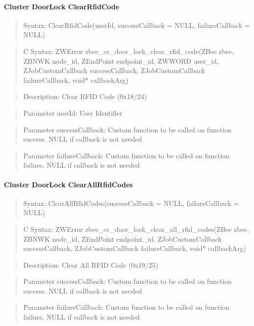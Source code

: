 \paragraph{Cluster DoorLock ClearRfidCode}
\begin{quote}Syntax: ClearRfidCode(userId, successCallback = NULL, failureCallback = NULL)\end{quote}
\begin{quote}C Syntax: ZWError zbee\_cc\_door\_lock\_clear\_rfid\_code(ZBee zbee, ZBNWK node\_id, ZEndPoint endpoint\_id, ZWWORD user\_id, ZJobCustomCallback successCallback, ZJobCustomCallback failureCallback, void* callbackArg)\end{quote}
\begin{quote}Description: Clear RFID Code (0x18/24)\end{quote}
\begin{quote}Parameter userId: User Identifier\end{quote}
\begin{quote}Parameter successCallback: Custom function to be called on function success. NULL if callback is not needed\end{quote}
\begin{quote}Parameter failureCallback: Custom function to be called on function failure. NULL if callback is not needed\end{quote}


\paragraph{Cluster DoorLock ClearAllRfidCodes}
\begin{quote}Syntax: ClearAllRfidCodes(successCallback = NULL, failureCallback = NULL)\end{quote}
\begin{quote}C Syntax: ZWError zbee\_cc\_door\_lock\_clear\_all\_rfid\_codes(ZBee zbee, ZBNWK node\_id, ZEndPoint endpoint\_id, ZJobCustomCallback successCallback, ZJobCustomCallback failureCallback, void* callbackArg)\end{quote}
\begin{quote}Description: Clear All RFID Code (0x19/25)\end{quote}
\begin{quote}Parameter successCallback: Custom function to be called on function success. NULL if callback is not needed\end{quote}
\begin{quote}Parameter failureCallback: Custom function to be called on function failure. NULL if callback is not needed\end{quote}

